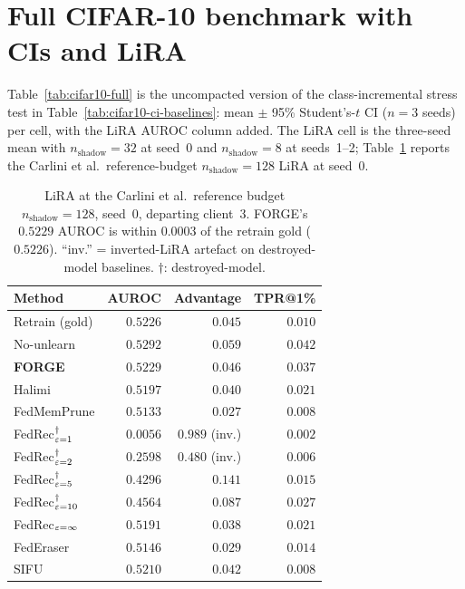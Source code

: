 \section{Full CIFAR-10 benchmark with CIs and LiRA}
\label{app:cifar10-full}

Table~\ref{tab:cifar10-full} is the uncompacted version of the class-incremental
stress test in Table~\ref{tab:cifar10-ci-baselines}: mean $\pm$ 95\%
Student's-$t$ CI ($n{=}3$ seeds) per cell, with the LiRA AUROC column added. The LiRA cell is the three-seed mean
with $n_\mathrm{shadow}{=}32$ at seed~0 and $n_\mathrm{shadow}{=}8$ at seeds~1--2;
Table~\ref{tab:lira-ref} reports the Carlini et al.\ reference-budget
$n_\mathrm{shadow}{=}128$ LiRA at seed~0.

\begin{table}[h]
\centering
\scriptsize
\setlength{\tabcolsep}{3pt}
\begin{tabular}{lrrr}
\toprule
Method & AUROC & Advantage & TPR@1\% \\
\midrule
Retrain (gold)                       & $0.5226$ & $0.045$ & $0.010$ \\
No-unlearn                           & $0.5292$ & $0.059$ & $0.042$ \\
\textbf{FORGE}                       & $\mathbf{0.5229}$ & $\mathbf{0.046}$ & $\mathbf{0.037}$ \\
Halimi \cite{halimi2022}             & $0.5197$ & $0.040$ & $0.021$ \\
FedMemPrune \cite{wei2026fedmemprune}& $0.5133$ & $0.027$ & $0.008$ \\
FedRec$^{\dag}_{\varepsilon{=}1}$           & $0.0056$ & $0.989$ (inv.) & $0.002$ \\
FedRec$^{\dag}_{\varepsilon{=}2}$           & $0.2598$ & $0.480$ (inv.) & $0.006$ \\
FedRec$^{\dag}_{\varepsilon{=}5}$           & $0.4296$ & $0.141$ & $0.015$ \\
FedRec$^{\dag}_{\varepsilon{=}10}$          & $0.4564$ & $0.087$ & $0.027$ \\
FedRec$_{\varepsilon{=}\infty}$             & $0.5191$ & $0.038$ & $0.021$ \\
FedEraser \cite{liu2021federaser}    & $0.5146$ & $0.029$ & $0.014$ \\
SIFU \cite{fraboni2024sifu}          & $0.5210$ & $0.042$ & $0.008$ \\
\bottomrule
\end{tabular}
\caption{LiRA at the Carlini et al.\ reference budget $n_\mathrm{shadow}{=}128$,
seed~0, departing client~3. FORGE's $0.5229$ AUROC is within $0.0003$ of the
retrain gold ($0.5226$). ``inv.'' = inverted-LiRA artefact on destroyed-model
baselines. $\dag$: destroyed-model.}
\label{tab:lira-ref}
\end{table}

